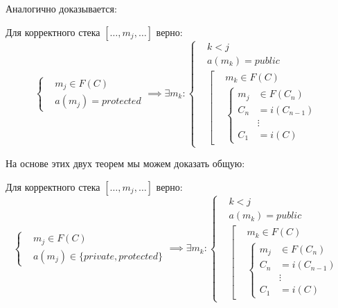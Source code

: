 \documentclass[graybox]{svmult}
\begin{document}
Аналогично доказывается:
\begin{theorem}
\label{method_before_protected}
Для корректного стека $[\dots, m_j, \dots]$ верно:
\begin{equation}
	\left\{	
		\begin{aligned}
			&m_j \in F(C)\\
			&a(m_j) = protected
		\end{aligned}
	\right.
	\implies
	\exists m_k: 
	\left\{
    	\begin{aligned}
			&k < j \\
			&a(m_k) = public \\
			&\left[
        		\begin{aligned}
					& m_k \in F(C) \\
   					&\left\{
   						\begin{aligned}
	   						m_j &\in F(C_n) \\
	   						C_n &= i(C_{n-1}) \\
	   						&\vdots \\
	   						C_1 &= i(C)
   						\end{aligned}
   					\right.
				\end{aligned}
			\right.
		\end{aligned}
	\right.
\end{equation}
\end{theorem}

На основе этих двух теорем мы можем доказать общую:
\begin{theorem}
\label{method_before_protected_and_private}
Для корректного стека $[\dots, m_j, \dots]$ верно:
\begin{equation}
	\left\{	
		\begin{aligned}
			&m_j \in F(C)\\
			&a(m_j) \in \{private, protected\}
		\end{aligned}
	\right.
	\implies
	\exists m_k: 
	\left\{
    	\begin{aligned}
			&k < j \\
			&a(m_k) = public \\
			&\left[
        		\begin{aligned}
					& m_k \in F(C) \\
   					&\left\{
   						\begin{aligned}
	   						m_j &\in F(C_n) \\
	   						C_n &= i(C_{n-1}) \\
	   						&\vdots \\
	   						C_1 &= i(C)
   						\end{aligned}
   					\right.
				\end{aligned}
			\right.
		\end{aligned}
	\right.
\end{equation}
\end{theorem}
\end{document}

